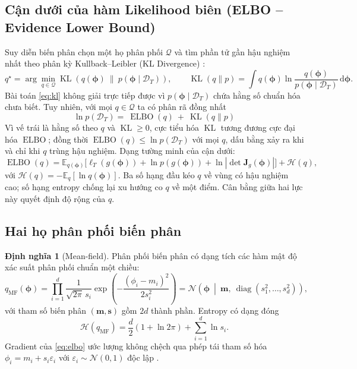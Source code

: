 \documentclass[12pt,a4paper]{article}
\numberwithin{equation}{section}
\theoremstyle{definition}
\newtheorem{definition}{Định nghĩa}[section]
\newcommand{\E}{\mathbb{E}}
\newcommand{\diag}{\operatorname{diag}}
\newcommand{\KL}{\operatorname{KL}}
\newcommand{\ELBO}{\operatorname{ELBO}}
\newcommand{\Data}{\mathcal{D}}
\newcommand{\vecphi}{\symbf{\phi}}
\newcommand{\diff}{\mathrm{d}}
\begin{document}
	\subsection{Cận dưới của hàm Likelihood biên (ELBO -- Evidence Lower Bound)}\label{subsec:elbo}
	Suy diễn biến phân chọn một họ phân phối $\mathcal{Q}$ và tìm phần tử gần hậu nghiệm nhất
	theo phân kỳ Kullback--Leibler (KL Divergence) \cite{blei2017}:
	\begin{equation}
		q^{\star}=\arg\min_{q\in\mathcal{Q}}
		\KL\!\left(q(\vecphi)\ \|\ p(\vecphi\mid\Data_T)\right),
		\qquad
		\KL\!\left(q\|p\right)=\int q(\vecphi)\ln\frac{q(\vecphi)}{p(\vecphi\mid\Data_T)}\,\diff\vecphi.
		\label{eq:kl}
	\end{equation}
	Bài toán \eqref{eq:kl} không giải trực tiếp được vì $p(\vecphi\mid\Data_T)$ chứa hằng số
	chuẩn hóa chưa biết. Tuy nhiên, với mọi $q\in\mathcal{Q}$ ta có phân rã đồng nhất
	\begin{equation}
		\ln p(\Data_T)
		=\ \ELBO(q)\ +\ \KL\!\left(q\|p\right)
		\label{eq:elbo-decomposition}
	\end{equation}
	Vì vế trái là hằng số theo $q$ và $\KL\ge 0$, cực tiểu hóa $\KL$ tương đương cực đại hóa
	$\ELBO$; đồng thời $\ELBO(q)\le\ln p(\Data_T)$ với mọi $q$, dấu bằng xảy ra khi và chỉ
	khi $q$ trùng hậu nghiệm. Dạng tường minh của cận dưới:
	\begin{equation}
		\ELBO(q)=\E_{q(\vecphi)}\!\Big[
		\ell_T\!\left(g(\vecphi)\right)
		+\ln p\!\left(g(\vecphi)\right)
		+\ln\left|\det\symbf J_g(\vecphi)\right|
		\Big]
		+\mathcal{H}(q),
		\label{eq:elbo}
	\end{equation}
	với $\mathcal{H}(q)=-\E_q[\ln q(\vecphi)]$. Ba số hạng đầu kéo $q$ về vùng có hậu nghiệm
	cao; số hạng entropy chống lại xu hướng co $q$ về một điểm. Cân bằng giữa hai lực này
	quyết định độ rộng của $q$.
	
	\subsection{Hai họ phân phối biến phân}\label{subsec:families}
	
	\begin{definition}[Mean-field]\label{def:mf}
		Phân phối biến phân có dạng tích các hàm mật độ xác suất phân phối chuẩn một chiều:
		\begin{equation}
			q_{\mathrm{MF}}(\vecphi)
			=\prod_{i=1}^{d}\frac{1}{\sqrt{2\pi}\,s_i}
			\exp\!\left(-\frac{\left(\phi_i-m_i\right)^{2}}{2s_i^{2}}\right)
			=\mathcal{N}\!\left(\vecphi\ \middle|\ \symbf m,\ \diag(s_1^{2},\dots,s_d^{2})\right),
			\label{eq:mean-field}
		\end{equation}
		với tham số biến phân $(\symbf m,\symbf s)$ gồm $2d$ thành phần. Entropy có dạng đóng
		\begin{equation}
			\mathcal{H}(q_{\mathrm{MF}})=\frac{d}{2}\left(1+\ln 2\pi\right)+\sum_{i=1}^{d}\ln s_i.
			\label{eq:mf-entropy}
		\end{equation}
		Gradient của \eqref{eq:elbo} ước lượng không chệch qua phép tái tham số hóa
		$\phi_i=m_i+s_i\varepsilon_i$ với $\varepsilon_i\sim\mathcal{N}(0,1)$ độc lập
		\cite{kingma2014}.
	\end{definition}
	
\end{document}

